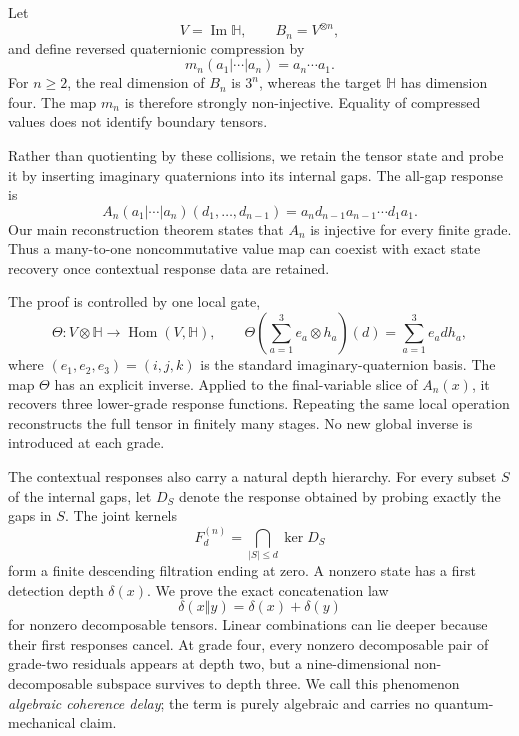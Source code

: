 \documentclass[11pt]{article}
\theoremstyle{definition}
\theoremstyle{remark}
\newcommand{\Hq}{\mathbb H}
\newcommand{\Hom}{\operatorname{Hom}}
\newcommand{\depth}{\delta}
\newcommand{\concat}{\mathbin{\Vert}}
\begin{document}
Let
\[
  V=\operatorname{Im}\Hq,\qquad B_n=V^{\otimes n},
\]
and define reversed quaternionic compression by
\begin{equation}\label{eq:compression}
  m_n(a_1|\cdots|a_n)=a_n\cdots a_1.
\end{equation}
For $n\ge 2$, the real dimension of $B_n$ is $3^n$, whereas the target $\Hq$ has dimension four.  The map $m_n$ is therefore strongly non-injective.  Equality of compressed values does not identify boundary tensors.

Rather than quotienting by these collisions, we retain the tensor state and probe it by inserting imaginary quaternions into its internal gaps.  The all-gap response is
\begin{equation}\label{eq:all-gap}
  A_n(a_1|\cdots|a_n)(d_1,\ldots,d_{n-1})
  =a_n d_{n-1}a_{n-1}\cdots d_1a_1.
\end{equation}
Our main reconstruction theorem states that $A_n$ is injective for every finite grade.  Thus a many-to-one noncommutative value map can coexist with exact state recovery once contextual response data are retained.

The proof is controlled by one local gate,
\begin{equation}\label{eq:theta}
\Theta:V\otimes\Hq\longrightarrow\Hom(V,\Hq),\qquad
\Theta\!\left(\sum_{a=1}^3 e_a\otimes h_a\right)(d)
=\sum_{a=1}^3 e_a d h_a,
\end{equation}
where $(e_1,e_2,e_3)=(i,j,k)$ is the standard imaginary-quaternion basis.  The map $\Theta$ has an explicit inverse.  Applied to the final-variable slice of $A_n(x)$, it recovers three lower-grade response functions.  Repeating the same local operation reconstructs the full tensor in finitely many stages.  No new global inverse is introduced at each grade.

The contextual responses also carry a natural depth hierarchy.  For every subset $S$ of the internal gaps, let $D_S$ denote the response obtained by probing exactly the gaps in $S$.  The joint kernels
\[
  F_d^{(n)}=\bigcap_{|S|\le d}\ker D_S
\]
form a finite descending filtration ending at zero.  A nonzero state has a first detection depth $\depth(x)$.  We prove the exact concatenation law
\[
  \depth(x\concat y)=\depth(x)+\depth(y)
\]
for nonzero decomposable tensors.  Linear combinations can lie deeper because their first responses cancel.  At grade four, every nonzero decomposable pair of grade-two residuals appears at depth two, but a nine-dimensional non-decomposable subspace survives to depth three.  We call this phenomenon \emph{algebraic coherence delay}; the term is purely algebraic and carries no quantum-mechanical claim.
\end{document}
